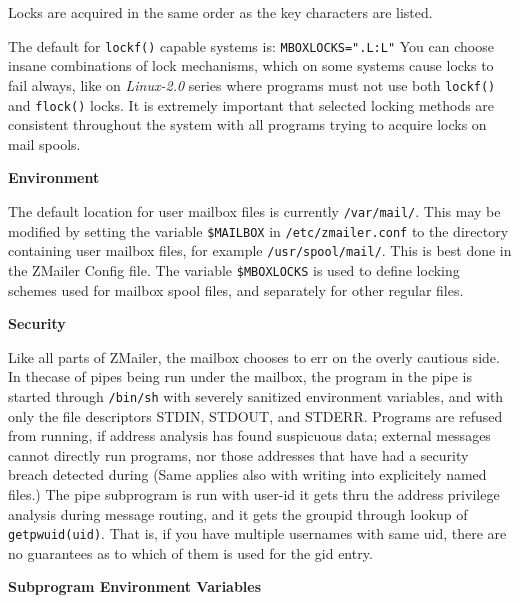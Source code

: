 Locks are acquired in the same order as the key characters are listed.

The default for {\tt lockf()} capable systems is: {\tt MBOXLOCKS=".L:L"}
You can choose insane combinations of lock mechanisms, which on
some systems cause locks to fail always, like on {\em Linux-2.0\/} series
where programs must not use both {\tt lockf()} and {\tt flock()} locks.
It is extremely important that selected locking methods are consistent
throughout the system with all programs trying to acquire locks on
mail spools.

{\bf Environment}

The default location for user mailbox files is 
currently {\tt /var/mail/}. This may be modified by setting the variable
{\tt \$MAILBOX} in {\tt /etc/zmailer.conf} to the directory containing 
user mailbox files, for example {\tt /usr/spool/mail/}. This is best done 
in the ZMailer Config file. The variable {\tt \$MBOXLOCKS} is used to define locking schemes used for
mailbox spool files, and separately for other regular files.

{\bf Security}

Like all parts of ZMailer, the mailbox chooses to
err on the overly cautious side.  In thecase of pipes being run under
the mailbox, the program in the pipe is started through {\tt /bin/sh} with
severely sanitized environment variables, and with only the file
descriptors STDIN, STDOUT, and STDERR. Programs are refused from
running, if address analysis has found suspicuous data; external
messages cannot directly run programs, nor those addresses that
have had a security breach detected during (Same applies also
with writing into explicitely named files.)
The pipe subprogram is run with user-id it gets thru the address
privilege analysis during message routing, and it gets the groupid 
through lookup of {\tt getpwuid(uid)}. That is, if you have multiple
usernames with same uid, there are no guarantees as to which of
them is used for the gid entry.

{\bf Subprogram Environment Variables}

